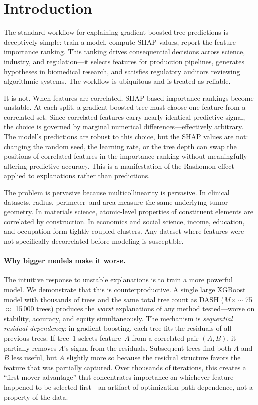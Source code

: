 \documentclass[11pt]{article}
\newcommand{\dash}{\textsc{DASH}}
\begin{document}
\section{Introduction}
\label{sec:introduction}

The standard workflow for explaining gradient-boosted tree predictions is
deceptively simple: train a model, compute SHAP values, report the feature
importance ranking. This ranking drives consequential decisions across
science, industry, and regulation---it selects features for production
pipelines, generates hypotheses in biomedical research, and satisfies
regulatory auditors reviewing algorithmic systems. The workflow is
ubiquitous and is treated as reliable.

It is not. When features are correlated, SHAP-based importance rankings
become unstable. At each split, a gradient-boosted tree must choose one
feature from a correlated set. Since correlated features carry nearly
identical predictive signal, the choice is governed by marginal numerical
differences---effectively arbitrary. The model's predictions are robust to
this choice, but the SHAP values are not: changing the random seed, the
learning rate, or the tree depth can swap the positions of correlated
features in the importance ranking without meaningfully altering predictive
accuracy. This is a manifestation of the Rashomon effect
\citep{breiman2001statistical} applied to explanations rather than
predictions.

The problem is pervasive because multicollinearity is pervasive. In
clinical datasets, radius, perimeter, and area measure the same underlying
tumor geometry. In materials science, atomic-level properties of
constituent elements are correlated by construction. In economics and
social science, income, education, and occupation form tightly coupled
clusters. Any dataset where features were not specifically decorrelated
before modeling is susceptible.

\paragraph{Why bigger models make it worse.}
The intuitive response to unstable explanations is to train a more powerful
model. We demonstrate that this is counterproductive. A single large
XGBoost model with thousands of trees and the same total tree count as \dash{} ($M \times \sim$75 $\approx$ 15\,000 trees) produces the \emph{worst} explanations of any method
tested---worse on stability, accuracy, and equity simultaneously. The
mechanism is \emph{sequential residual dependency}: in gradient boosting,
each tree fits the residuals of all previous trees. If tree~1 selects
feature~$A$ from a correlated pair $(A, B)$, it partially removes $A$'s
signal from the residuals. Subsequent trees find both $A$ and $B$ less
useful, but $A$ slightly more so because the residual structure favors the
feature that was partially captured. Over thousands of iterations, this
creates a ``first-mover advantage'' that concentrates importance on
whichever feature happened to be selected first---an artifact of
optimization path dependence, not a property of the data.
\end{document}
